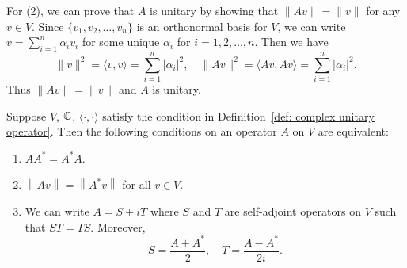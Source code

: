     \begin{proofenv}
        For (2), we can prove that $A$ is unitary by showing that $\| Av \| = \|v\|$ for any $v\in V$. Since $ \{v_1, v_2, \ldots, v_n\}$ is an orthonormal basis for $V$, we can write $v = \displaystyle \sum_{i=1}^n \alpha_i v_i$ for some unique $\alpha_i$ for $i=1,2,\ldots,n$. Then we have
        \[
        \| v \|^2 = \langle v, v \rangle = \sum_{i=1}^n |\alpha_i|^2, \quad \| Av \|^2 = \langle Av, Av \rangle = \sum_{i=1}^n |\alpha_i|^2.
        \]
        Thus $\| Av \| = \|v\|$ and $A$ is unitary.
    \end{proofenv}
    \begin{corollaryenv}
        Suppose $V$, $\mathbb{C}$, $\langle \cdot, \cdot \rangle$ satisfy the condition in Definition~\ref{def: complex unitary operator}. Then the following conditions on an operator $A$ on $V$ are equivalent:
        \begin{enumerate}
            \item $AA^* = A^*A$.
            \item $\left\| Av\right\| = \left\| A^* v\right\|$ for all $v\in V$.
            \item We can write $A=S+iT$ where $S$ and $T$ are self-adjoint operators on $V$ such that $ST=TS$. Moreover,
            $$ S = \frac{A+A^*}{2}, \quad T = \frac{A-A^*}{2i}. $$
        \end{enumerate}
    \end{corollaryenv}

    \newpage
